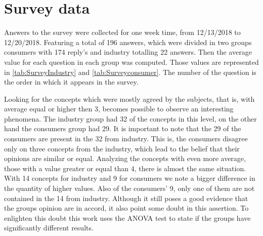 \section{Survey data}

Answers to the survey were collected for one week time, from 12/13/2018 to 12/20/2018. Featuring a total of 196 answers, which were divided in two groups consumers with 174 reply's and industry totalling 22 answers. Then the average value for each question in each group was computed. Those values are represented in \autoref{tab:SurveyIndustry} and \autoref{tab:Surveyconsumer}. The number of the question is the order in which it appears in the survey.




Looking for the concepts which were mostly agreed by the subjects, that is, with average equal or higher then 3, becomes possible to observe an interesting phenomena. The industry group had 32 of the concepts in this level, on the other hand the consumers group had 29. It is important to note that the 29 of the consumers are present in the 32 from industry. This is, the consumers disagree only on three concepts from the industry, which lead to the belief that their opinions are similar or equal. Analyzing the concepts with even more average, those with a value greater or equal than 4, there is almost the same situation. With 14 concepts for industry and 9 for consumers we note a bigger difference in the quantity of higher values. Also of the consumers' 9, only one of them are not contained in the 14 from industry. Although it still poses a good evidence that the groups opinion are in accord, it also point some doubt in this assertion. To enlighten this doubt this work uses the ANOVA test to state if the groups have significantly different results.

